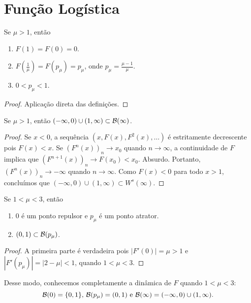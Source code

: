 \section{Função Logística}

\begin{proposition}
Se $\mu > 1$, então
\begin{enumerate}
\item $F(1) = F(0) = 0$.
\item $F \left( \frac{1}{\mu} \right) = F(p_\mu) = p_\mu$, onde $p_\mu = \frac{\mu-1}{\mu}$.
\item $0 < p_\mu < 1$.
\end{enumerate}
\end{proposition}

\begin{proof}
Aplicação direta das definições.
\end{proof}

\begin{proposition} \label{prop 2-1}
Se $\mu > 1$, então $(-\infty, 0) \cup (1, \infty) \subset \mathcal{B}(\infty)$.
\end{proposition}

\begin{proof}
Se $x < 0$, a sequência  $(x, F(x), F^2(x), \dots)$ é estritamente decrescente pois  $F(x) < x$. Se $(F^n(x))_n \to x_0$ quando $n \to \infty$, a continuidade de $F$ implica que $(F^{n+1}(x))_n \to F (x_0) < x_0$. Absurdo. Portanto, $(F^n(x))_n \to -\infty$ quando $n \to \infty$. Como $F(x) < 0$ para todo $x > 1$, concluímos que $(-\infty, 0) \cup (1, \infty) \subset W^s(\infty)$.
\end{proof}

\begin{proposition}
Se $1 < \mu < 3$, então
\begin{enumerate}
\item $0$ é um ponto repulsor e $p_\mu$ é um ponto atrator.
\item $(0, 1) \subset \mathcal{B}(p_\mu)$.
\end{enumerate}
\end{proposition}

\begin{proof}
A primeira parte é verdadeira pois $|F'(0)| = \mu > 1$ e $|F'(p_\mu)| = |2 - \mu| < 1$, quando $1 < \mu < 3$.
\end{proof}

Desse modo, conhecemos completamente a dinâmica de $F$ quando $1 < \mu < 3$:
$$\mathcal{B}(0) = \{0, 1\}\textrm{, } \mathcal{B}(p_\mu) = (0, 1)\textrm{ e }\mathcal{B}(\infty) = (-\infty, 0) \cup (1, \infty).$$
